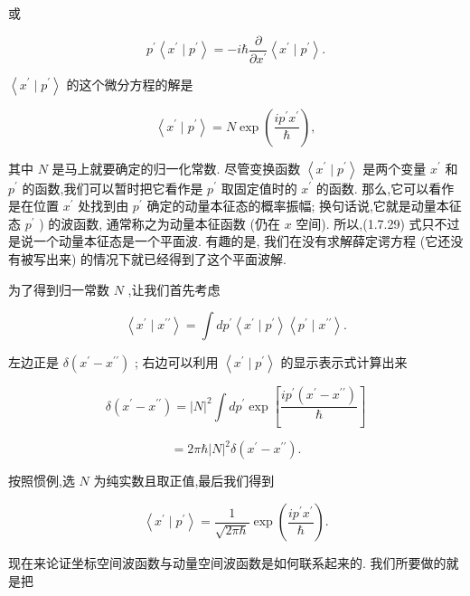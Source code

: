 \documentclass[lang=cn,newtx,10pt,scheme=chinese,thmcnt=section]{elegantbook}
\begin{document}
或

$$
{p}^{\prime }\left\langle {{x}^{\prime } \mid {p}^{\prime }}\right\rangle = - i\hbar \frac{\partial }{\partial {x}^{\prime }}\left\langle {{x}^{\prime } \mid {p}^{\prime }}\right\rangle . \tag{1. 7.28}
$$

$\left\langle {{x}^{\prime } \mid {p}^{\prime }}\right\rangle$ 的这个微分方程的解是

$$
\left\langle {{x}^{\prime } \mid {p}^{\prime }}\right\rangle = N\exp \left( \frac{i{p}^{\prime }{x}^{\prime }}{\hbar }\right) , \tag{1.7.29}
$$

其中 $N$ 是马上就要确定的归一化常数. 尽管变换函数 $\left\langle {{x}^{\prime } \mid {p}^{\prime }}\right\rangle$ 是两个变量 ${x}^{\prime }$ 和 ${p}^{\prime }$ 的函数,我们可以暂时把它看作是 ${p}^{\prime }$ 取固定值时的 ${x}^{\prime }$ 的函数. 那么,它可以看作是在位置 ${x}^{\prime }$ 处找到由 ${p}^{\prime }$ 确定的动量本征态的概率振幅; 换句话说,它就是动量本征态 ${p}^{\prime }$ ) 的波函数, 通常称之为动量本征函数 (仍在 $x$ 空间). 所以,(1.7.29) 式只不过是说一个动量本征态是一个平面波. 有趣的是, 我们在没有求解薛定谔方程 (它还没有被写出来) 的情况下就已经得到了这个平面波解.

为了得到归一常数 $N$ ,让我们首先考虑

$$
\left\langle {{x}^{\prime } \mid {x}^{\prime \prime }}\right\rangle = \int d{p}^{\prime }\left\langle {{x}^{\prime } \mid {p}^{\prime }}\right\rangle \left\langle {{p}^{\prime } \mid {x}^{\prime \prime }}\right\rangle . \tag{1. 7.30}
$$

左边正是 $\delta \left( {{x}^{\prime } - {x}^{\prime \prime }}\right)$ ; 右边可以利用 $\left\langle {{x}^{\prime } \mid {p}^{\prime }}\right\rangle$ 的显示表示式计算出来

$$
\delta \left( {{x}^{\prime } - {x}^{\prime \prime }}\right) = {\left| N\right| }^{2}\int d{p}^{\prime }\exp \left\lbrack \frac{i{p}^{\prime }\left( {{x}^{\prime } - {x}^{\prime \prime }}\right) }{\hbar }\right\rbrack \tag{1.7.31}
$$

$$
= {2\pi }\hbar {\left| N\right| }^{2}\delta \left( {{x}^{\prime } - {x}^{\prime \prime }}\right) .
$$

按照惯例,选 $N$ 为纯实数且取正值,最后我们得到

$$
\left\langle {{x}^{\prime } \mid {p}^{\prime }}\right\rangle = \frac{1}{\sqrt{{2\pi }\hbar }}\exp \left( \frac{i{p}^{\prime }{x}^{\prime }}{\hbar }\right) . \tag{1. 7.32}
$$

现在来论证坐标空间波函数与动量空间波函数是如何联系起来的. 我们所要做的就是把
\end{document}
